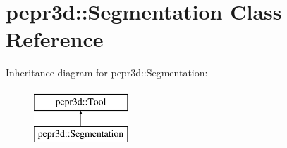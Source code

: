\hypertarget{classpepr3d_1_1_segmentation}{}\section{pepr3d\+::Segmentation Class Reference}
\label{classpepr3d_1_1_segmentation}
Inheritance diagram for pepr3d\+::Segmentation\+:\begin{figure}[H]
\begin{center}
\leavevmode
\includegraphics[height=2.000000cm]{classpepr3d_1_1_segmentation}
\end{center}
\end{figure}
